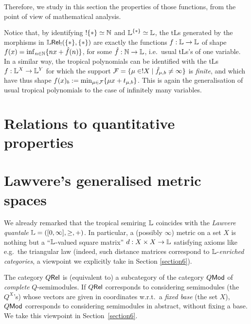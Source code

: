 \documentclass[submission,%
]{eptcs}
\begin{document}
Therefore, we study in this section the properties of those functions, from the point of view of mathematical analysis.
 
% 
%

Notice that, by identifying $!\{*\}\simeq \mathbb{N}$ and $\mathbb{L}^{\{*\}}\simeq\mathbb{L}$, the tLs generated by the morphisms in ${\mathbb{L} \mathsf{Rel}_!}(\{*\},\{*\})$ are exactly the functions $f:\mathbb{L}\to\mathbb{L}$ of shape $f(x)=\inf_{n\in\mathbb{N}}\{nx+\hat{f}(n)\}$, for some $\hat{f}:\mathbb{N}\to\mathbb{L}$, i.e.\ usual tLs's of one variable.
In a similar way, the tropical polynomials can be identified with the tLs
$f:\mathbb{L}^X\to\mathbb{L}^Y$ 
 for which the support $\mathcal{F}=\{\mu\in!X\mid\hat{f}_{\mu,b}\neq\infty\}$ is \emph{finite}, and which have thus shape $f(x)_b:=\min_{\mu\in\mathcal{F}} \{\mu x+ t_{\mu,b}\}$.
 This is again the generalisation of usual tropical polynomials to the case of infinitely many variables.


\section{Relations to quantitative properties}



\section{Lawvere's generalised metric spaces}

We already remarked that the tropical semiring $\mathbb{L}$ coincides with the \emph{Lawvere quantale} $\mathbb{L}=([0,\infty], \geq, +)$.
In particular, a (possibly $\infty$) metric on a set $X$ is nothing but a ``$\mathbb{L}$-valued square matrix'' $d:X\times X\to \mathbb{L}$ satisfying axioms like e.g.~the triangular law (indeed, such distance matrices correspond to $\mathbb{L}$-\emph{enriched categories}, a viewpoint we explicitly take in Section \ref{section6}). 

\begin{remark}
 The category $Q \mathsf{Rel}$ is (equivalent to) a subcategory of the category $Q\mathsf{Mod}$ of \emph{complete} $Q$-semimodules.
 If $Q \mathsf{Rel}$ corresponds to considering semimodules (the $Q^X$'s) whose vectors are given in coordinates w.r.t.\ a \emph{fixed base} (the set $X$), $Q\mathsf{Mod}$ corresponds to considering semimodules in abstract, without fixing a base.
 We take this viewpoint in Section~\ref{section6}.
\end{remark}
\end{document}
